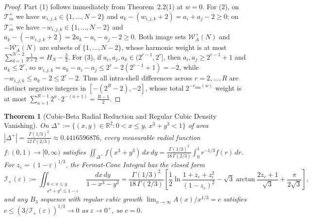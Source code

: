 \documentclass[11pt,a4paper]{article}
\newtheorem{theorem}{Theorem}[section]
\theoremstyle{remark}
\begin{document}
\begin{proof}
Part (1) follows immediately from Theorem~2.2(1) at $w = 0$. For (2), on $\mathcal{T}_m^+$ we have $w_{i,j,k} \in \{1, \dots, N-2\}$ and $a_k - (w_{i,j,k} + 2) = a_i + a_j - 2 \ge 0$; on $\mathcal{T}_m^-$ we have $-w_{i,j,k} \in \{1, \dots, N-2\}$ and $a_k - (-w_{i,j,k} + 2) = 2 a_k - a_i - a_j - 2 \ge 0$. Both image sets $\mathcal{W}_A^+(N)$ and $-\mathcal{W}_A^-(N)$ are subsets of $\{1, \dots, N-2\}$, whose harmonic weight is at most $\sum_{d=1}^{N-2} \frac{1}{d + 2} = H_N - \frac{3}{2}$. For (3), if $a_i, a_j, a_k \in (2^{r-1}, 2^r]$, then $a_i, a_j \ge 2^{r-1} + 1$ and $a_k \le 2^r$, so $w_{i,j,k} = a_k - a_i - a_j \le 2^r - 2(2^{r-1} + 1) = -2$, while $-w_{i,j,k} \le a_k - 2 \le 2^r - 2$. Thus all intra-shell differences across $r = 2, \dots, R$ are distinct negative integers in $[-(2^R - 2), -2]$, whose total $2^{-r_{\min}(w)}$ weight is at most $\sum_{u=1}^{R-1} 2^u \cdot 2^{-(u+1)} = \frac{R - 1}{2}$.
\end{proof}

\begin{theorem}[Cubic-Beta Radial Reduction and Regular Cubic Density Vanishing]
On $\Delta^+ := \{(x, y) \in \mathbb{R}^2 : 0 < x \le y,\, x^3 + y^3 < 1\}$ of area $|\Delta^+| = \frac{\Gamma(1/3)^2}{12\,\Gamma(2/3)} \approx 0.4416596876$, every measurable radial function $f : (0, 1) \to [0, \infty)$ satisfies $\iint_{\Delta^+} f(x^3+y^3)\,dx\,dy = \frac{\Gamma(1/3)^2}{18\,\Gamma(2/3)} \int_0^1 r^{-1/3} f(r)\,dr$. For $z_\varepsilon = (1 - \varepsilon)^{1/3}$, the Fermat-Cone Integral has the closed form
\[
  \mathcal{I}_+(\varepsilon) := \iint_{\substack{0 < x \le y \\ x^3 + y^3 \le 1 - \varepsilon}} \frac{dx\,dy}{1 - x^3 - y^3} = \frac{\Gamma(1/3)^2}{18\,\Gamma(2/3)} \left[ \frac{1}{2} \ln \frac{1 + z_\varepsilon + z_\varepsilon^2}{(1 - z_\varepsilon)^2} - \sqrt{3} \arctan \frac{2 z_\varepsilon + 1}{\sqrt{3}} + \frac{\pi}{2\sqrt{3}} \right],
\]
and any $B_3$ sequence with regular cubic growth $\lim_{x\to\infty} A(x)/x^{1/3} = c$ satisfies $c \le (3/\mathcal{I}_+(\varepsilon))^{1/3} \to 0$ as $\varepsilon \to 0^+$, so $c = 0$.
\end{theorem}
\end{document}
